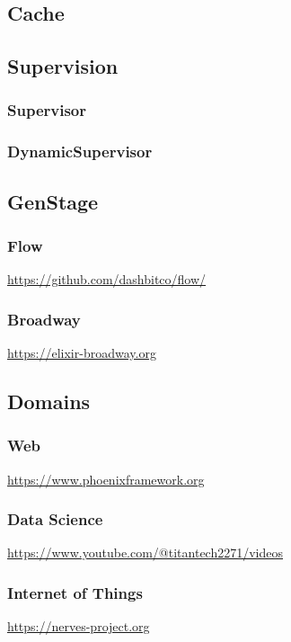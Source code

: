 \subsection{Cache}

\subsection{Supervision}
\subsubsection{Supervisor}
\subsubsection{DynamicSupervisor}

\subsection{GenStage}
\subsubsection{Flow}

\url{https://github.com/dashbitco/flow/}

\subsubsection{Broadway}

\url{https://elixir-broadway.org}

\subsection{Domains}

\subsubsection{Web}

\url{https://www.phoenixframework.org}



\subsubsection{Data Science}

\url{https://www.youtube.com/@titantech2271/videos}

\subsubsection{Internet of Things}

\url{https://nerves-project.org}

